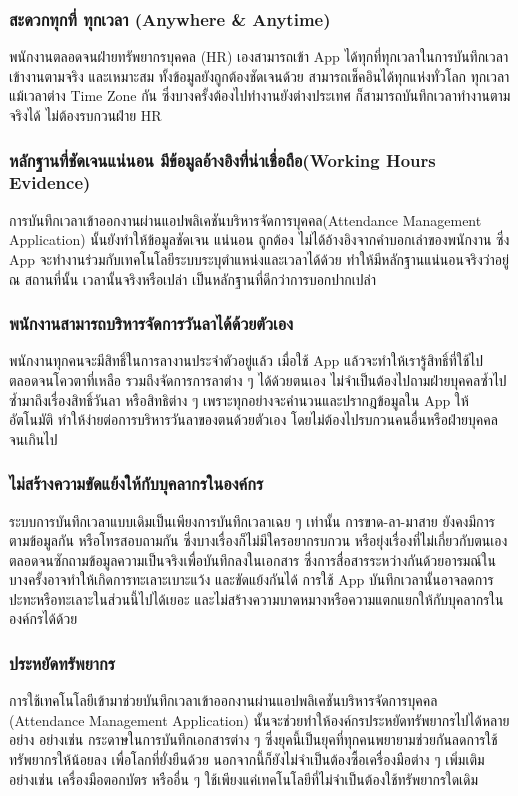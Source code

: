 \subsubsection{สะดวกทุกที่ ทุกเวลา (Anywhere \& Anytime)}
\quad พนักงานตลอดจนฝ่ายทรัพยากรบุคคล (HR) เองสามารถเข้า App ได้ทุกที่ทุกเวลาในการบันทึกเวลาเข้างานตามจริง และเหมาะสม ทั้งข้อมูลยังถูกต้องชัดเจนด้วย สามารถเช็คอินได้ทุกแห่งทั่วโลก ทุกเวลา แม้เวลาต่าง Time Zone กัน ซึ่งบางครั้งต้องไปทำงานยังต่างประเทศ ก็สามารถบันทึกเวลาทำงานตามจริงได้ ไม่ต้องรบกวนฝ่าย HR 
\subsubsection{หลักฐานที่ชัดเจนแน่นอน มีข้อมูลอ้างอิงที่น่าเชื่อถือ(Working Hours Evidence)}
\quad การบันทึกเวลาเข้าออกงานผ่านแอปพลิเคชันบริหารจัดการบุคคล(Attendance Management Application) นั้นยังทำให้ข้อมูลชัดเจน แน่นอน ถูกต้อง ไม่ได้อ้างอิงจากคำบอกเล่าของพนักงาน ซึ่ง App จะทำงานร่วมกับเทคโนโลยีระบบระบุตำแหน่งและเวลาได้ด้วย ทำให้มีหลักฐานแน่นอนจริงว่าอยู่ ณ สถานที่นั้น เวลานั้นจริงหรือเปล่า เป็นหลักฐานที่ดีกว่าการบอกปากเปล่า 
\subsubsection{พนักงานสามารถบริหารจัดการวันลาได้ด้วยตัวเอง}
\quad พนักงานทุกคนจะมีสิทธิ์ในการลางานประจำตัวอยู่แล้ว เมื่อใช้ App แล้วจะทำให้เรารู้สิทธิ์ที่ใช้ไป ตลอดจนโควตาที่เหลือ รวมถึงจัดการการลาต่าง ๆ ได้ด้วยตนเอง ไม่จำเป็นต้องไปถามฝ่ายบุคคลซ้ำไปซ้ำมาถึงเรื่องสิทธิ์วันลา หรือสิทธิต่าง ๆ เพราะทุกอย่างจะคำนวนและปรากฎข้อมูลใน App ให้อัตโนมัติ ทำให้ง่ายต่อการบริหารวันลาของตนด้วยตัวเอง โดยไม่ต้องไปรบกวนคนอื่นหรือฝ่ายบุคคลจนเกินไป 
\subsubsection{ไม่สร้างความขัดแย้งให้กับบุคลากรในองค์กร }  
\quad ระบบการบันทึกเวลาแบบเดิมเป็นเพียงการบันทึกเวลาเฉย ๆ เท่านั้น การขาด-ลา-มาสาย ยังคงมีการตามข้อมูลกัน หรือโทรสอบถามกัน ซึ่งบางเรื่องก็ไม่มีใครอยากรบกวน หรือยุ่งเรื่องที่ไม่เกี่ยวกับตนเอง ตลอดจนซักถามข้อมูลความเป็นจริงเพื่อบันทึกลงในเอกสาร ซึ่งการสื่อสารระหว่างกันด้วยอารมณ์ในบางครั้งอาจทำให้เกิดการทะเลาะเบาะแว้ง และขัดแย้งกันได้ การใช้ App บันทึกเวลานั้นอาจลดการปะทะหรือทะเลาะในส่วนนี้ไปได้เยอะ และไม่สร้างความบาดหมางหรือความแตกแยกให้กับบุคลากรในองค์กรได้ด้วย 
\subsubsection{ประหยัดทรัพยากร}  
\quad การใช้เทคโนโลยีเข้ามาช่วยบันทึกเวลาเข้าออกงานผ่านแอปพลิเคชันบริหารจัดการบุคคล (Attendance Management Application) นั้นจะช่วยทำให้องค์กรประหยัดทรัพยากรไปได้หลายอย่าง อย่างเช่น กระดาษในการบันทึกเอกสารต่าง ๆ ซึ่งยุคนี้เป็นยุคที่ทุกคนพยายามช่วยกันลดการใช้ทรัพยากรให้น้อยลง เพื่อโลกที่ยั่งยืนด้วย นอกจากนี้ก็ยังไม่จำเป็นต้องซื้อเครื่องมือต่าง ๆ เพิ่มเติม อย่างเช่น เครื่องมือตอกบัตร หรืออื่น ๆ ใช้เพียงแค่เทคโนโลยีที่ไม่จำเป็นต้องใช้ทรัพยากรใดเดิม 
